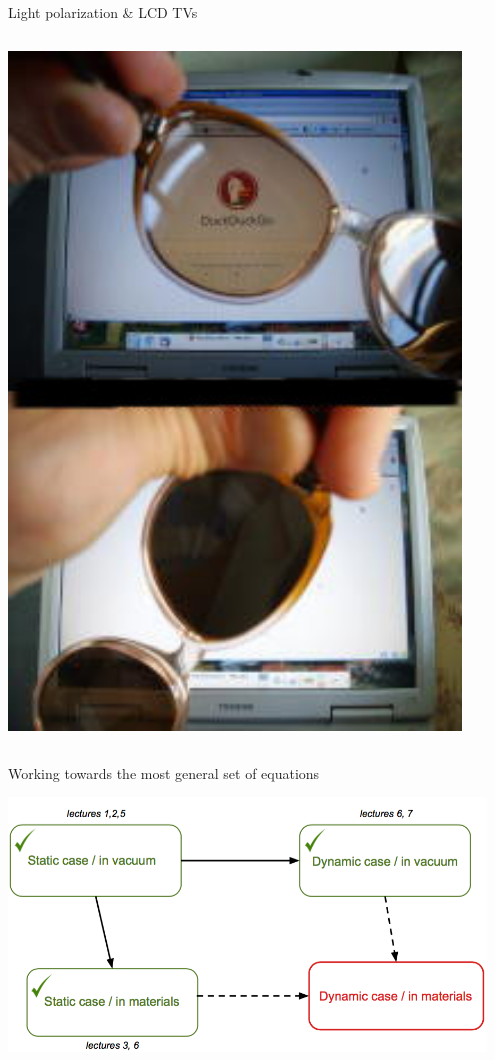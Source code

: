 \begin{frame}{Light polarization \& LCD TVs}
\begin{columns}
\begin{column}{0.40\textwidth}
       \includegraphics[width=0.90\textwidth]{./images/photos/polarized_light_lcd_display.jpg}\\
  \end{column}
\end{columns}

\end{frame}


%
%
%

\begin{frame}{Working towards the most general set of equations}

\begin{center}
    \includegraphics[width=0.95\textwidth]{./images/schematics/maxwell_eq_variations_2.png}\\
\end{center}

\end{frame}

